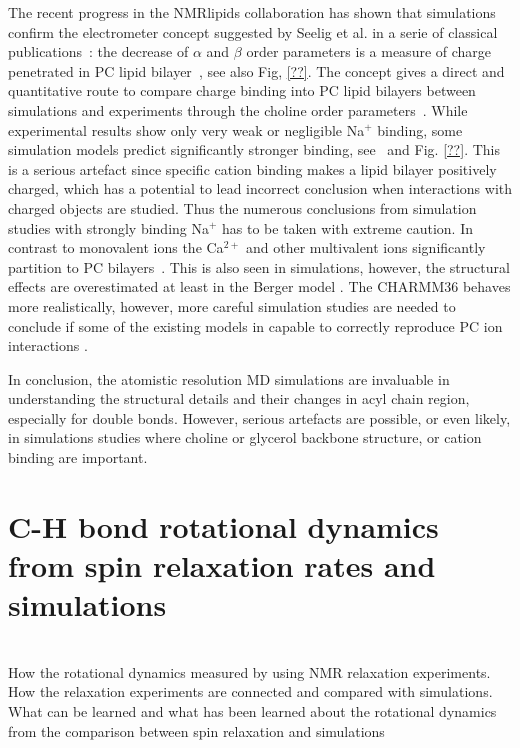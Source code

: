 \documentclass[aps,prl,superscriptaddress,twocolumn]{revtex4}
\begin{document}
The recent progress in the NMRlipids collaboration has shown that simulations confirm the electrometer 
concept suggested by Seelig et al. in a serie of classical publications~\cite{??}: 
the decrease of $\alpha$ and $\beta$ order parameters is a measure of 
charge penetrated in PC lipid bilayer~\cite{ionpaper}, see also Fig, \ref{??}. The concept gives a 
direct and quantitative route to compare charge binding into PC lipid bilayers between simulations
and experiments through the choline order parameters~\cite{ionpaper}. While experimental results show 
only very weak or negligible Na$^{+}$ binding, some simulation models predict significantly stronger
binding, see~\cite{ionpaper} and Fig. \ref{??}. This is a serious artefact since specific cation binding 
makes a lipid bilayer positively charged, which has a potential to lead incorrect conclusion when interactions with
charged objects are studied. Thus the numerous conclusions from simulation studies with strongly binding 
Na$^{+}$ has to be taken with extreme caution. In contrast to monovalent ions the Ca$^{2+}$ and other multivalent ions
significantly partition to PC bilayers~\cite{??}. This is also seen in simulations, however, the structural
effects are overestimated at least in the Berger model \cite{ionpaper}. The CHARMM36 behaves more realistically, 
however, more careful simulation studies are needed to conclude if some of the existing models in capable to correctly
reproduce PC ion interactions \cite{ionpaper}. 

In conclusion, the atomistic resolution MD simulations are invaluable in understanding the 
structural details and their changes in acyl chain region, especially for double bonds.
However, serious artefacts are possible, or even likely, in simulations studies where choline or
glycerol backbone structure, or cation binding are important.


\section{C-H bond rotational dynamics from spin relaxation rates and simulations}

\\[0.1cm]

\noindent How the rotational dynamics measured by using NMR relaxation experiments. \\
How the relaxation experiments are connected and compared with simulations. \\
What can be learned and what has been learned about the rotational dynamics from the comparison between spin relaxation and simulations \\[0.5 cm]
\end{document}
